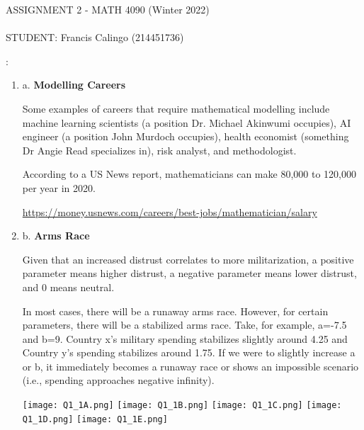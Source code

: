 \documentclass[12pt]{amsart}
\newcounter{probnum}
\newenvironment{prob}{\begin{enumerate}\setcounter{enumi}{\value{probnum}}}%
 {\setcounter{probnum}{\value{enumi}}\end{enumerate}}
\begin{document}
\begin{center}
{\large \sc 
ASSIGNMENT 2 - MATH 4090 (Winter 2022)} \\
\  \\
{\sc  STUDENT:} Francis Calingo (214451736)\\

 \end{center}
\vspace{.5in}

:  

\begin{prob}

  \item[a.] {\bf Modelling Careers}
  
  \noindent Some examples of careers that require mathematical modelling include machine learning scientists (a position Dr. Michael Akinwumi occupies),  AI engineer (a position John Murdoch occupies), health economist (something Dr Angie Read specializes in), risk analyst, and methodologist.

  \noindent According to a US News report, mathematicians can make 80,000 to 120,000 per year in 2020. 
  
  \url{https://money.usnews.com/careers/best-jobs/mathematician/salary}
  
  \item[b.] {\bf Arms Race}

  \noindent Given that an increased distrust correlates to more militarization, a positive parameter means higher distrust, a negative parameter means lower distrust, and 0 means neutral.
  
\noindent In most cases, there will be a runaway arms race. However, for certain parameters, there will be a stabilized arms race. Take, for example, a=-7.5 and b=9. Country x's military spending stabilizes slightly around 4.25 and Country y's spending stabilizes around 1.75. If we were to slightly increase a or b, it immediately becomes a runaway race or shows an impossible scenario (i.e., spending approaches negative infinity).

\bigskip 
\begin{center}
    \texttt{[image: Q1\_1A.png]}
    \vspace{0.5em}
    \texttt{[image: Q1\_1B.png]}
    \vspace{0.5em}
    \texttt{[image: Q1\_1C.png]}
    \vspace{0.5em}
    \texttt{[image: Q1\_1D.png]}
    \vspace{0.5em}
    \texttt{[image: Q1\_1E.png]}
\end{center}


\end{prob}
\end{document}
